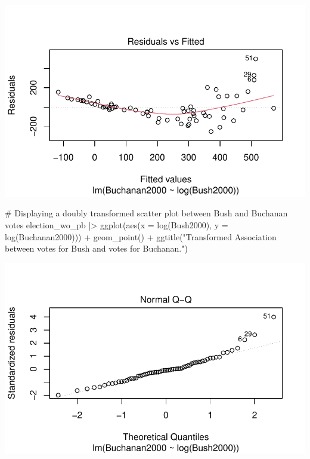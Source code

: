 \documentclass[
  letterpaper,
  DIV=11,
  numbers=noendperiod]{scrartcl}
\newenvironment{Shaded}{\begin{snugshade}}{\end{snugshade}}
\newcommand{\AttributeTok}[1]{\textcolor[rgb]{0.40,0.45,0.13}{#1}}
\newcommand{\CommentTok}[1]{\textcolor[rgb]{0.37,0.37,0.37}{#1}}
\newcommand{\FunctionTok}[1]{\textcolor[rgb]{0.28,0.35,0.67}{#1}}
\newcommand{\NormalTok}[1]{\textcolor[rgb]{0.00,0.23,0.31}{#1}}
\newcommand{\SpecialCharTok}[1]{\textcolor[rgb]{0.37,0.37,0.37}{#1}}
\newcommand{\StringTok}[1]{\textcolor[rgb]{0.13,0.47,0.30}{#1}}
\begin{document}
\includegraphics{case_study_1_files/figure-pdf/unnamed-chunk-3-1.pdf}

\begin{Shaded}
\begin{Highlighting}[]
\CommentTok{\# Displaying a doubly transformed scatter plot between Bush and Buchanan votes}
\NormalTok{election\_wo\_pb }\SpecialCharTok{|\textgreater{}} \FunctionTok{ggplot}\NormalTok{(}\FunctionTok{aes}\NormalTok{(}\AttributeTok{x =} \FunctionTok{log}\NormalTok{(Bush2000), }\AttributeTok{y =} \FunctionTok{log}\NormalTok{(Buchanan2000))) }\SpecialCharTok{+} \FunctionTok{geom\_point}\NormalTok{() }\SpecialCharTok{+} \FunctionTok{ggtitle}\NormalTok{(}\StringTok{"Transformed Association between votes for Bush and votes for Buchanan."}\NormalTok{)}
\end{Highlighting}
\end{Shaded}

\includegraphics{case_study_1_files/figure-pdf/unnamed-chunk-3-2.pdf}
\end{document}
